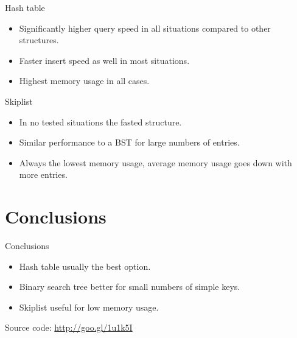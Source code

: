 \documentclass[10pt]{beamer}
\begin{document}
\begin{frame}{Hash table}
    \begin{itemize}
        \item Significantly higher query speed in all situations compared to other structures.
        \item Faster insert speed as well in most situations.
        \item Highest memory usage in all cases.
    \end{itemize}
\end{frame}

\begin{frame}{Skiplist}
    \begin{itemize}
        \item In no tested situations the fasted structure.
        \item Similar performance to a BST for large numbers of entries.
        \item Always the lowest memory usage, average memory usage goes down with more entries.
    \end{itemize}
\end{frame}

\section{Conclusions}

\begin{frame}{Conclusions}
    \begin{itemize}
        \item Hash table usually the best option.
        \item Binary search tree better for small numbers of simple keys.
        \item Skiplist useful for low memory usage.
    \end{itemize}

    Source code: \url{http://goo.gl/1u1k5I}
\end{frame}
\end{document}

